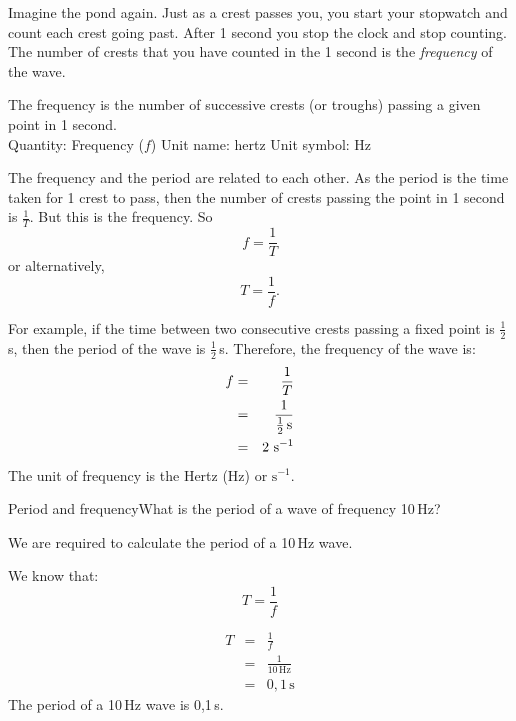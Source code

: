 \label{m38806*id319238}Imagine the pond again. Just as a crest passes you, you start your stopwatch and count each crest going past. After 1 second you stop the clock and stop counting. The number of crests that you have counted in the 1 second is the \textsl{frequency} of the wave.\par 

 { The frequency is the number of successive crests (or troughs) passing a given point in 1 second.\\
Quantity: Frequency ($f$) \hspace{1cm} Unit name: hertz \hspace{1cm} Unit symbol: Hz } 
        
The frequency and the period are related to each other. As the period is the time taken for 1 crest to pass, then the number of crests passing the point in 1 second is $\frac{1}{T}$. But this is the frequency. So
\begin{equation*}
\boxed{f=\frac{1}{T}}
\end{equation*}
or alternatively,
\begin{equation*}
\boxed{T=\frac{1}{f}}.
\end{equation*}

For example, if the time between two consecutive crests passing a fixed point is $\frac{1}{2}\,$s, then the period of the wave is $\frac{1}{2}\,$s. Therefore, the frequency of the wave is:
\begin{eqnarray*}
f&=&\frac{1}{T}\\
&=&\frac{1}{\frac{1}{2}\,\text{s}}\\
&=&2 \text{ s}^{-1}
\end{eqnarray*}
The unit of frequency is the Hertz (Hz) or $\text{s}^{-1}$.
\pagebreak

\begin{wex}{Period and frequency}{What is the period of a wave of frequency 10\,Hz?}{
We are required to calculate the period of a 10\,Hz wave.

We know that:
\begin{equation}
T=\frac{1}{f}\nonumber 
\end{equation}

\begin{eqnarray*}
T&=&\frac{1}{f}\\
&=&\frac{1}{10\,\text{Hz}}\\
&=&0,1\,\text{s}
\end{eqnarray*}
The period of a 10\,Hz wave is 0,1\,s.}
\end{wex}

